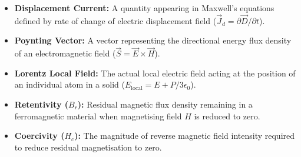 \documentclass[12pt,a4paper]{article}
\begin{document}
\begin{tcolorbox}[defbox, title={\textbf{One-Line Definitions}}]
\begin{itemize}[leftmargin=*, itemsep=2pt]
  \item \textbf{Displacement Current:} A quantity appearing in Maxwell's equations defined by rate of change of electric displacement field ($\vec{J}_d = \partial\vec{D}/\partial t$).
  \item \textbf{Poynting Vector:} A vector representing the directional energy flux density of an electromagnetic field ($\vec{S} = \vec{E} \times \vec{H}$).
  \item \textbf{Lorentz Local Field:} The actual local electric field acting at the position of an individual atom in a solid ($E_{\text{local}} = E + P/3\epsilon_0$).
  \item \textbf{Retentivity ($B_r$):} Residual magnetic flux density remaining in a ferromagnetic material when magnetising field $H$ is reduced to zero.
  \item \textbf{Coercivity ($H_c$):} The magnitude of reverse magnetic field intensity required to reduce residual magnetisation to zero.
\end{itemize}
\end{tcolorbox}
\end{document}

